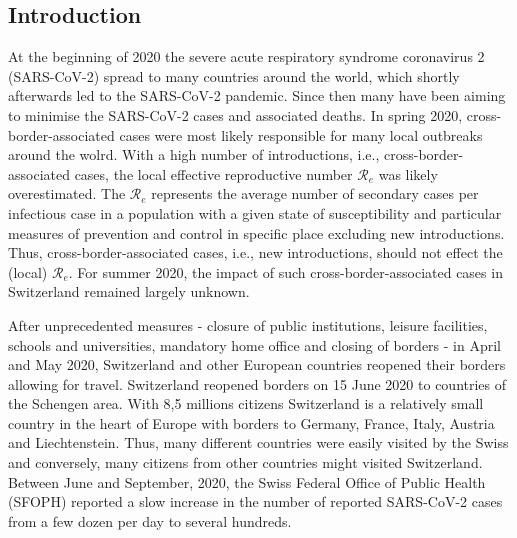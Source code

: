 \documentclass[10pt, a4paper, twoside]{article}
\begin{document}
\begin{multicols}{2}
\section{Introduction}

\lhead{ }
At the beginning of 2020 the severe acute respiratory syndrome coronavirus 2 (SARS-CoV-2) spread to many countries around the world, which shortly afterwards led to the SARS-CoV-2 pandemic.\cite{worobey_emergence_2020}
Since then many have been aiming to minimise the SARS-CoV-2 cases and associated deaths.
In spring 2020, cross-border-associated cases were most likely responsible for many local outbreaks around the wolrd.\cite{russell_effect_2021}
With a high number of introductions, i.e., cross-border-associated cases, the local effective reproductive number $\mathcal{R}_e$ was likely overestimated.\cite{roberts_early_2011}
The $\mathcal{R}_e$ represents the average number of secondary cases per infectious case in a population with a given state of susceptibility and particular measures of prevention and control in specific place excluding new introductions.
Thus, cross-border-associated cases, i.e., new introductions, should not effect the (local) $\mathcal{R}_e$.
For summer 2020, the impact of such cross-border-associated cases in Switzerland remained largely unknown.

After unprecedented measures - closure of public institutions, leisure facilities, schools and universities, mandatory home office and closing of borders -  in April and May 2020, Switzerland and other European countries reopened their borders allowing for travel.
Switzerland reopened borders on 15 June 2020 to countries of the Schengen area.\cite{federal_council_coronavirus_2020}
With 8,5 millions citizens Switzerland is a relatively small country in the heart of Europe with borders to Germany, France, Italy, Austria and Liechtenstein.
Thus, many different countries were easily visited by the Swiss and conversely, many citizens from other countries might visited Switzerland.
Between June and September, 2020, the Swiss Federal Office of Public Health (SFOPH) reported a slow increase in the number of reported SARS-CoV-2 cases from a few dozen per day to several hundreds.


\end{multicols}
\end{document}

